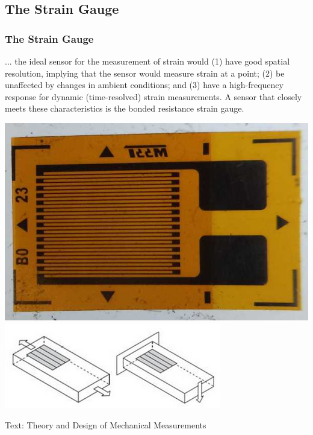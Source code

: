 \documentclass[fleqn]{beamer} %
\newcommand{\sectionIsubsectionIIItitle}{The Strain Gauge}
\begin{document}
		\subsection{\sectionIsubsectionIIItitle}\label{sectionIsubsectionIII}
			\begin{frame} 
				\frametitle{\sectionIsubsectionIIItitle} \scriptsize

				... the ideal sensor for the measurement of strain would (1) have good spatial resolution, implying
				that the sensor would measure strain at a point; (2) be unaffected by changes in ambient conditions;
				and (3) have a high-frequency response for dynamic (time-resolved) strain measurements. A sensor
				that closely meets these characteristics is the {\BL bonded resistance strain gauge}. \vspc

				\includegraphics[scale=.20]{images/unmounted_strain_gauge.jpg}\hspccc \includegraphics[scale=.4]{images/mounted_gages.png}

				\bigskip
				{\tiny Text: Theory and Design of Mechanical Measurements}

				
			\end{frame}	
\end{document}
